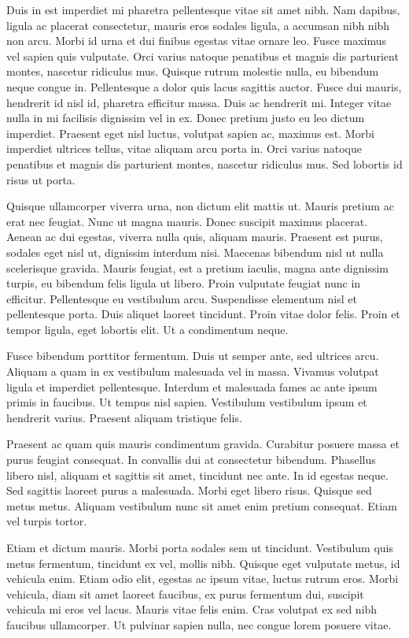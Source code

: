 Duis in est imperdiet mi pharetra pellentesque vitae sit amet nibh. Nam dapibus, ligula ac placerat consectetur, mauris eros sodales ligula, a accumsan nibh nibh non arcu. Morbi id urna et dui finibus egestas vitae ornare leo. Fusce maximus vel sapien quis vulputate. Orci varius natoque penatibus et magnis dis parturient montes, nascetur ridiculus mus. Quisque rutrum molestie nulla, eu bibendum neque congue in. Pellentesque a dolor quis lacus sagittis auctor. Fusce dui mauris, hendrerit id nisl id, pharetra efficitur massa. Duis ac hendrerit mi. Integer vitae nulla in mi facilisis dignissim vel in ex. Donec pretium justo eu leo dictum imperdiet. Praesent eget nisl luctus, volutpat sapien ac, maximus est. Morbi imperdiet ultrices tellus, vitae aliquam arcu porta in. Orci varius natoque penatibus et magnis dis parturient montes, nascetur ridiculus mus. Sed lobortis id risus ut porta.

Quisque ullamcorper viverra urna, non dictum elit mattis ut. Mauris pretium ac erat nec feugiat. Nunc ut magna mauris. Donec suscipit maximus placerat. Aenean ac dui egestas, viverra nulla quis, aliquam mauris. Praesent est purus, sodales eget nisl ut, dignissim interdum nisi. Maecenas bibendum nisl ut nulla scelerisque gravida. Mauris feugiat, est a pretium iaculis, magna ante dignissim turpis, eu bibendum felis ligula ut libero. Proin vulputate feugiat nunc in efficitur. Pellentesque eu vestibulum arcu. Suspendisse elementum nisl et pellentesque porta. Duis aliquet laoreet tincidunt. Proin vitae dolor felis. Proin et tempor ligula, eget lobortis elit. Ut a condimentum neque.

Fusce bibendum porttitor fermentum. Duis ut semper ante, sed ultrices arcu. Aliquam a quam in ex vestibulum malesuada vel in massa. Vivamus volutpat ligula et imperdiet pellentesque. Interdum et malesuada fames ac ante ipsum primis in faucibus. Ut tempus nisl sapien. Vestibulum vestibulum ipsum et hendrerit varius. Praesent aliquam tristique felis.

Praesent ac quam quis mauris condimentum gravida. Curabitur posuere massa et purus feugiat consequat. In convallis dui at consectetur bibendum. Phasellus libero nisl, aliquam et sagittis sit amet, tincidunt nec ante. In id egestas neque. Sed sagittis laoreet purus a malesuada. Morbi eget libero risus. Quisque sed metus metus. Aliquam vestibulum nunc sit amet enim pretium consequat. Etiam vel turpis tortor.

Etiam et dictum mauris. Morbi porta sodales sem ut tincidunt. Vestibulum quis metus fermentum, tincidunt ex vel, mollis nibh. Quisque eget vulputate metus, id vehicula enim. Etiam odio elit, egestas ac ipsum vitae, luctus rutrum eros. Morbi vehicula, diam sit amet laoreet faucibus, ex purus fermentum dui, suscipit vehicula mi eros vel lacus. Mauris vitae felis enim. Cras volutpat ex sed nibh faucibus ullamcorper. Ut pulvinar sapien nulla, nec congue lorem posuere vitae.

